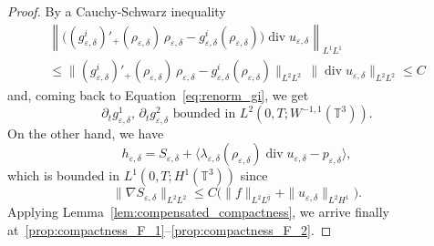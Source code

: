 \documentclass[10pt]{amsart}
\newcommand{\<}{\bigl\langle}
\renewcommand{\>}{\bigr\rangle}
\theoremstyle{definition}
\theoremstyle{remark}
\newcommand{\TT}{\mathbb{T}^3}
\DeclareMathOperator{\Div}{div}
\let\ep\varepsilon
\begin{document}
\begin{proof}
By a Cauchy-Schwarz inequality
\begin{multline*}
\left\|\bigl((g_{\ep,\delta}^i)'_+(\rho_{\ep,\delta}) \, \rho_{\ep,\delta}-g_{\ep,\delta}^i(\rho_{\ep,\delta}) \bigr) \Div u_{\ep,\delta} \right\|_{L^1L^1} \\
\leq \|(g_{\ep,\delta}^i)'_+(\rho_{\ep,\delta}) \, \rho_{\ep,\delta}-g_{\ep,\delta}^i(\rho_{\ep,\delta}) \|_{L^2L^2}\, \|{\Div u_{\ep,\delta}}\|_{L^2L^2} \leq C
\end{multline*}
and, coming back to Equation~\eqref{eq:renorm_gi}, we get
\begin{equation*}
\partial_t g_{\ep,\delta}^1, \, \partial_t g_{\ep,\delta}^2 \text{ bounded in } L^2(0,T;W^{-1,1}(\TT)).
\end{equation*}
On the other hand, we have
\[
h_{\ep,\delta} = S_{\ep,\delta} + \<\lambda_{\ep,\delta}(\rho_{\ep,\delta})\Div u_{\ep,\delta} - p_{\ep,\delta}\>,
\]
which is bounded in $L^1(0,T;H^1(\TT))$ since
\[
\|\nabla S_{\ep,\delta}\|_{L^2L^2} \leq C \big(\|f\|_{L^2L^{\bar{q}}}+ \|u_{\ep,\delta}\|_{L^2H^1}\big).
\]
Applying Lemma~\ref{lem:compensated_compactness}, we arrive finally at~\eqref{prop:compactness_F_1}--\eqref{prop:compactness_F_2}.
\end{proof}
\end{document}
